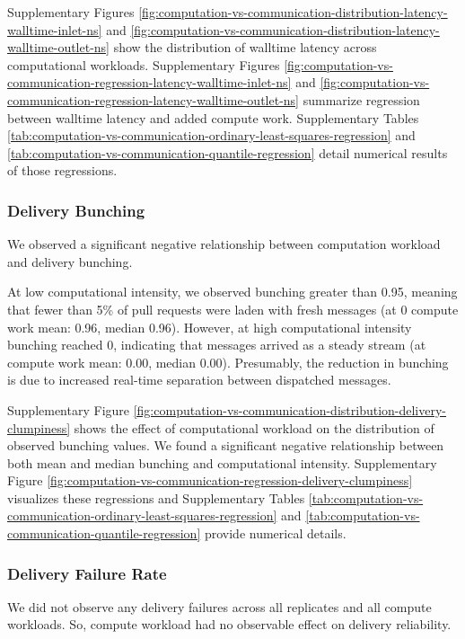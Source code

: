 Supplementary Figures \ref{fig:computation-vs-communication-distribution-latency-walltime-inlet-ns} and \ref{fig:computation-vs-communication-distribution-latency-walltime-outlet-ns} show the distribution of walltime latency across computational workloads.
Supplementary Figures \ref{fig:computation-vs-communication-regression-latency-walltime-inlet-ns} and \ref{fig:computation-vs-communication-regression-latency-walltime-outlet-ns} summarize regression between walltime latency and added compute work.
Supplementary Tables \ref{tab:computation-vs-communication-ordinary-least-squares-regression} and \ref{tab:computation-vs-communication-quantile-regression} detail numerical results of those regressions.

\subsubsection{Delivery Bunching}

We observed a significant negative relationship between computation workload and delivery bunching.

At low computational intensity, we observed bunching greater than 0.95, meaning that fewer than 5\% of pull requests were laden with fresh messages (at 0 compute work mean: 0.96, median 0.96).
However, at high computational intensity bunching reached 0, indicating that messages arrived as a steady stream (at  compute work mean: 0.00, median 0.00).
Presumably, the reduction in bunching is due to increased real-time separation between dispatched messages.

Supplementary Figure \ref{fig:computation-vs-communication-distribution-delivery-clumpiness} shows the effect of computational workload on the distribution of observed bunching values.
We found a significant negative relationship between both mean and median bunching and computational intensity.
Supplementary Figure \ref{fig:computation-vs-communication-regression-delivery-clumpiness} visualizes these regressions and Supplementary Tables \ref{tab:computation-vs-communication-ordinary-least-squares-regression} and \ref{tab:computation-vs-communication-quantile-regression} provide numerical details.

\subsubsection{Delivery Failure Rate}

We did not observe any delivery failures across all replicates and all compute workloads.
So, compute workload had no observable effect on delivery reliability.

